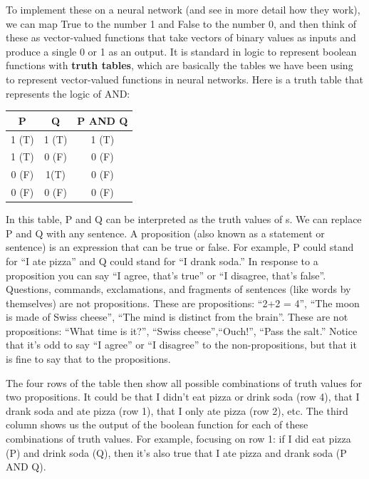 To implement these on a neural network (and see in more detail how they work), we  can map True to the number 1 and False to the number 0, and then think of these as vector-valued functions that take vectors of binary values as inputs and produce a single 0 or 1 as an output. It is standard in logic to represent boolean functions with \textbf{truth tables}, which are basically the tables we have been using to represent vector-valued functions in neural networks. Here is a truth table that represents the logic of AND:

\begin{center}
\begin{tabular}{| c | c || c | }
\hline
  P  & Q & P AND Q  \\
\hline
  1 (T) & 1 (T) & 1 (T)  \\
\hline
 1 (T) & 0 (F) & 0 (F)  \\
\hline
 0 (F) & 1(T) & 0  (F) \\
\hline
 0 (F) & 0 (F) & 0 (F) \\
\hline
\end{tabular}
\end{center}


In this table,  P and Q can be interpreted as the truth values of s. We can replace P and Q with any sentence. A proposition (also known as a statement or sentence) is an expression that can be true or false. For example, P could stand for ``I ate pizza'' and Q could stand for ``I drank soda.''  In response to a proposition you can say ``I agree, that's true'' or ``I disagree, that's false''. Questions, commands, exclamations, and fragments of sentences (like words by themselves) are not propositions. These are propositions: ``2+2 = 4'', ``The moon is made of Swiss cheese'', ``The mind is distinct from the brain''.  These are not propositions: ``What time is it?'', ``Swiss cheese'',``Ouch!'', ``Pass the salt.'' Notice that it's odd to say ``I agree'' or ``I disagree'' to the non-propositions, but that it is fine to say that to the propositions.

The four rows of the table then show all possible combinations of truth values for  two propositions. It could be that I didn't eat  pizza or drink soda (row 4), that I drank soda and ate pizza (row 1), that I only ate pizza (row 2), etc. The third column shows us the output of the boolean function for each of these combinations of truth values. For example, focusing on row 1: if I did eat pizza (P) and drink soda (Q), then it's also true that I ate pizza and drank soda (P AND Q). 

